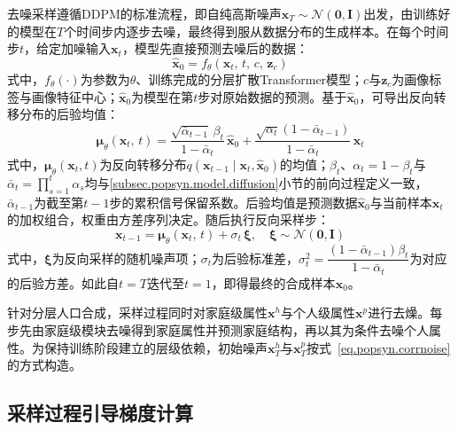 去噪采样遵循DDPM的标准流程\cite{hoDenoisingDiffusionProbabilistic2020}，即自纯高斯噪声$\mathbf{x}_T \sim \mathcal{N}(\mathbf{0}, \mathbf{I})$出发，由训练好的模型在$T$个时间步内逐步去噪，最终得到服从数据分布的生成样本。在每个时间步$t$，给定加噪输入$\mathbf{x}_t$，模型先直接预测去噪后的数据：
\begin{equation}
  \hat{\mathbf{x}}_0 = f_{\theta}\left(\mathbf{x}_t,\, t,\, c,\, \mathbf{z}_c\right)
  \label{eq.popsyn.x0pred}
\end{equation}
式中，$f_{\theta}(\cdot)$为参数为$\theta$、训练完成的分层扩散Transformer模型；$c$与$\mathbf{z}_c$为画像标签与画像特征中心；$\hat{\mathbf{x}}_0$为模型在第$t$步对原始数据的预测。基于$\hat{\mathbf{x}}_0$，可导出反向转移分布的后验均值：
\begin{equation}
  \boldsymbol{\mu}_{\theta}\left(\mathbf{x}_t,\, t\right) = \frac{\sqrt{\bar{\alpha}_{t-1}}\, \beta_t}{1 - \bar{\alpha}_t}\, \hat{\mathbf{x}}_0 + \frac{\sqrt{\alpha_t}\left(1 - \bar{\alpha}_{t-1}\right)}{1 - \bar{\alpha}_t}\, \mathbf{x}_t
  \label{eq.popsyn.postmean}
\end{equation}
式中，$\boldsymbol{\mu}_{\theta}(\mathbf{x}_t, t)$为反向转移分布$q(\mathbf{x}_{t-1} \mid \mathbf{x}_t, \hat{\mathbf{x}}_0)$的均值；$\beta_t$、$\alpha_t = 1 - \beta_t$与$\bar{\alpha}_t = \prod_{s=1}^{t}\alpha_s$均与\ref{subsec.popsyn.model.diffusion}小节的前向过程定义一致，$\bar{\alpha}_{t-1}$为截至第$t-1$步的累积信号保留系数。后验均值是预测数据$\hat{\mathbf{x}}_0$与当前样本$\mathbf{x}_t$的加权组合，权重由方差序列决定。随后执行反向采样步：
\begin{equation}
  \mathbf{x}_{t-1} = \boldsymbol{\mu}_{\theta}\left(\mathbf{x}_t,\, t\right) + \sigma_t\, \boldsymbol{\xi}, \quad \boldsymbol{\xi} \sim \mathcal{N}(\mathbf{0}, \mathbf{I})
  \label{eq.popsyn.reverse}
\end{equation}
式中，$\boldsymbol{\xi}$为反向采样的随机噪声项；$\sigma_t$为后验标准差，$\sigma_t^2 = \dfrac{\left(1 - \bar{\alpha}_{t-1}\right)\beta_t}{1 - \bar{\alpha}_t}$为对应的后验方差。如此自$t = T$迭代至$t = 1$，即得最终的合成样本$\mathbf{x}_0$。
 
针对分层人口合成，采样过程同时对家庭级属性$\mathbf{x}^{h}$与个人级属性$\mathbf{x}^{p}$进行去燥。每步先由家庭级模块去噪得到家庭属性并预测家庭结构，再以其为条件去噪个人属性。为保持训练阶段建立的层级依赖，初始噪声$\mathbf{x}_T^{h}$与$\mathbf{x}_T^{p}$按式~\eqref{eq.popsyn.corrnoise}的方式构造。
 
\subsection{采样过程引导梯度计算}\label{subsec.popsyn.guidance.energy}
 
